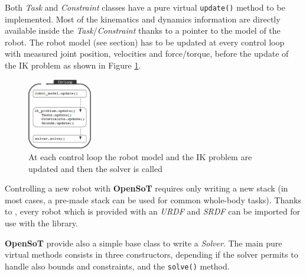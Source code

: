 Both \emph{Task} and \emph{Constraint} classes have a pure virtual \texttt{\small update()} method to be implemented. Most of the kinematics and dynamics information are directly available inside the \emph{Task}/\emph{Constraint} thanks to a pointer to the model of the robot. The robot model (see  section) has to be updated at every control loop with measured joint position, velocities and force/torque, before the update of the IK problem as shown in Figure \ref{update}.

\begin{figure}[!ht]
\vspace{2 mm}
\centering
\includegraphics[width=0.25\textwidth]{images/software/update.eps}
\caption{At each control loop the robot model and the IK problem are updated and then the solver is called}
\label{update}
\end{figure}

Controlling a new robot with \textbf{OpenSoT} requires only writing a new stack (in most cases, a pre-made stack can be used for common whole-body tasks). Thanks to , every robot which is provided with an \emph{URDF} and \emph{SRDF} can be imported for use with the library.

\textbf{OpenSoT} provide also a simple base class to write a \emph{Solver}. The main pure virtual methods consists in three constructors, depending if the solver permits to handle also bounds and constraints, and the \texttt{\small solve()} method. 

